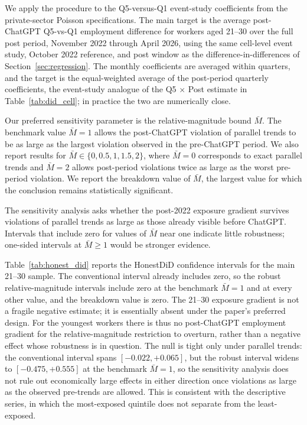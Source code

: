\documentclass[12pt]{article}
\begin{document}
We apply the procedure to the Q5-versus-Q1 event-study coefficients from the private-sector Poisson specifications. The main target is the average post-ChatGPT Q5-vs-Q1 employment difference for workers aged 21--30 over the full post period, November 2022 through April 2026, using the same cell-level event study, October 2022 reference, and post window as the difference-in-differences of Section~\ref{sec:regression}. The monthly coefficients are averaged within quarters, and the target is the equal-weighted average of the post-period quarterly coefficients, the event-study analogue of the Q5 $\times$ Post estimate in Table~\ref{tab:did_cell}; in practice the two are numerically close.

Our preferred sensitivity parameter is the relative-magnitude bound $\bar{M}$. The benchmark value $\bar{M}=1$ allows the post-ChatGPT violation of parallel trends to be as large as the largest violation observed in the pre-ChatGPT period. We also report results for $\bar{M}\in\{0,0.5,1,1.5,2\}$, where $\bar{M}=0$ corresponds to exact parallel trends and $\bar{M}=2$ allows post-period violations twice as large as the worst pre-period violation. We report the breakdown value of $\bar{M}$, the largest value for which the conclusion remains statistically significant.

The sensitivity analysis asks whether the post-2022 exposure gradient survives violations of parallel trends as large as those already visible before ChatGPT. Intervals that include zero for values of $\bar{M}$ near one indicate little robustness; one-sided intervals at $\bar{M}\geq 1$ would be stronger evidence.

Table~\ref{tab:honest_did} reports the HonestDiD confidence intervals for the main 21--30 sample. The conventional interval already includes zero, so the robust relative-magnitude intervals include zero at the benchmark $\bar{M}=1$ and at every other value, and the breakdown value is zero. The 21--30 exposure gradient is not a fragile negative estimate; it is essentially absent under the paper's preferred design. For the youngest workers there is thus no post-ChatGPT employment gradient for the relative-magnitude restriction to overturn, rather than a negative effect whose robustness is in question. The null is tight only under parallel trends: the conventional interval spans $[-0.022, +0.065]$, but the robust interval widens to $[-0.475, +0.555]$ at the benchmark $\bar{M}=1$, so the sensitivity analysis does not rule out economically large effects in either direction once violations as large as the observed pre-trends are allowed. This is consistent with the descriptive series, in which the most-exposed quintile does not separate from the least-exposed.
\end{document}
